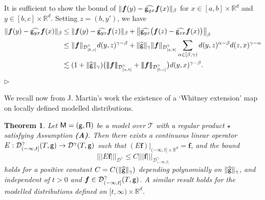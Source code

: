 \documentclass[10pt, reqno]{amsart}
\numberwithin{subsection}{section}
\numberwithin{subsubsection}{subsection}
\numberwithin{equation}{section} %
\newenvironment{Dem}[1][\unskip]{%
    \begin{list}{\hspace{1.15cm}{\sf \textbf{{\small Proof #1 --}}}}{%
        \setlength{\topsep}{0pt}%
        \setlength{\leftmargin}{0pt}%
        \setlength{\rightmargin}{0pt}%
        \setlength{\listparindent}{0pt}%
        \setlength{\itemindent}{0pt}%
        \setlength{\parsep}{0pt}%
        \addtolength{\leftmargin}{0pt}%
        \addtolength{\rightmargin}{0pt}%
    } \item }{\hfill $\rhd$\end{list}\smallskip}
\theoremstyle{mystyle}
\newtheorem{thm}{Theorem}
\theoremstyle{mystyle2}
\theoremstyle{mystyle3}
\newcommand{\REFA}{\textbf{\textsf{(A)}}}
\newcommand{\trino}[1]{|\!|\!|#1|\!|\!|}
\newcommand{\brarb}[1]{[\hspace{-0.5mm}]#1[\hspace{-0.5mm}]}
\newcommand{\bsf}{\boldsymbol{f}}
\newcommand\bbR{\mathbb{R}}
\newcommand{\mcD}{\mathcal{D}}
\begin{document}
\medskip

\begin{Dem}
It is sufficient to show the bound of $\|\bsf(y)-\widehat{{\sf g}_{yx}}\bsf(x)\|_\beta$ for $x\in[a,b]\times\bbR^d$ and $y\in[b,c]\times\bbR^d$. Setting $z=(b,y')$, we have
\begin{align*}
\|\bsf(y)-\widehat{{\sf g}_{yx}}\bsf(x)\|_\beta
&\le\|\bsf(y)-\widehat{{\sf g}_{yz}}\bsf(z)\|_\beta+\big\|\widehat{{\sf g}_{yz}}\big(\bsf(z)-\widehat{{\sf g}_{zx}}\bsf(x)\big)\big\|_\beta\\
&\le\|\bsf\|_{\mcD_{[b,c]}^\gamma}d(y,z)^{\gamma-\beta}
+\|\widehat{\sf g}\|_\gamma\|\bsf\|_{\mcD_{[a,b]}^\gamma}\sum_{\alpha\in[\beta,\gamma)}d(y,z)^{\alpha-\beta}d(z,x)^{\gamma-\alpha}\\
&\lesssim(1+\|\widehat{\sf g}\|_\gamma)\big(\trino{\bsf}_{\mcD_{[a,b]}^\gamma}+\trino{\bsf}_{\mcD_{[b,c]}^\gamma}\big)d(y,x)^{\gamma-\beta}.
\end{align*}
\end{Dem}

\medskip


We recall now from J. Martin's work \cite[Theorem 5.3.16]{Martin} the existence of a `Whitney extension' map on locally defined modelled distributions. 

\medskip

\begin{thm}
\label{thm Whitney extension}
Let $\sf M=(g,\Pi)$ be a model over $\mathscr{T}$ with a regular product $\star$ satisfying Assumption \REFA. Then there exists a continuous linear operator $E:\mcD_{(-\infty,t]}^\gamma(T,{\sf g})\to\mcD^\gamma(T,\sf g)$ such that $(E\bsf)\vert_{(-\infty,t]\times\bbR^d}=\bsf$, and the bound
$$
\trino{E\bsf}_{\mcD^\gamma}\le C\trino{\bsf}_{\mcD_{(-\infty,t]}^\gamma}
$$
holds for a positive constant $C=C(\|\widehat{\sf g}\|_\gamma)$ depending polynomially on $\|\widehat{\sf g}\|_\gamma$, and independent of $t>0$ and $\bsf\in\mcD_{(-\infty,t]}^\gamma(T,\sf g)$. A similar result holds for the modelled distributions defined on $[t,\infty)\times\bbR^d$.
\end{thm}
\end{document}

